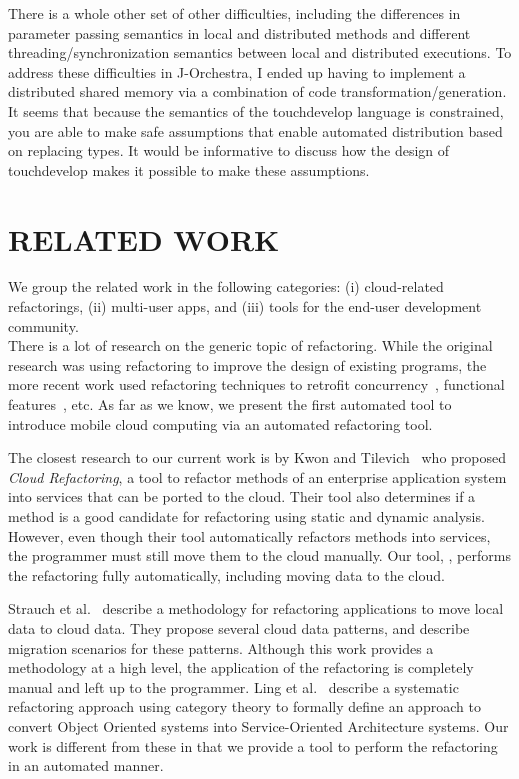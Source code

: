 \documentclass[article]{sigplanconf}
\begin{document}
There is a whole other set of other difficulties, including the differences in parameter passing semantics in local and distributed methods and different threading/synchronization semantics between local and distributed executions. To address these difficulties in J-Orchestra, I ended up having to implement a distributed shared memory via a combination of code transformation/generation. It seems that because the semantics of the touchdevelop language is constrained, you are able to make safe assumptions that enable automated distribution based on replacing types. It would be informative to discuss how the design of touchdevelop makes it possible to make these assumptions.







\section{RELATED WORK}
\label{sec:relatedWork}

We group the related work in the following categories: (i) cloud-related refactorings, (ii) multi-user apps, and (iii) tools for the end-user development community. \\

There is a lot of research on the generic topic of refactoring. While the original research was using refactoring to improve the design of existing programs, the more recent work used refactoring techniques to retrofit 
concurrency~\cite{wloka2009refactoring,dig2009refactoring}, functional features~\cite{Gyori:Lambdaficator}, etc.
As far as we know, we present the first automated tool to introduce mobile cloud computing via an automated refactoring tool.

The closest research to our current work is by Kwon and Tilevich~\cite{kwon2013cloud} who proposed \emph{Cloud Refactoring}, a tool to refactor methods of an enterprise application system into services that can be  ported to the cloud. Their tool also determines if a method is a good candidate for refactoring using static and dynamic analysis. However, even though their tool automatically refactors methods into services, the programmer must still move them to the cloud manually.  
Our tool, \tool, performs the refactoring fully automatically, including moving data to the cloud.  

Strauch et al.~\cite{strauchmigrating} describe a methodology for refactoring applications to move local data to cloud data. They propose several cloud data patterns, and describe migration scenarios for these patterns. Although this work provides a methodology at a high level, the application of the refactoring is completely manual and left up to the programmer. 
Ling et al.~\cite{ling2010refactoring} describe a systematic refactoring approach 
using category theory to formally define an approach to convert Object Oriented systems 
into Service-Oriented Architecture systems. 
Our work is different from these in that we provide a tool to perform the refactoring in an automated manner.
\end{document}
